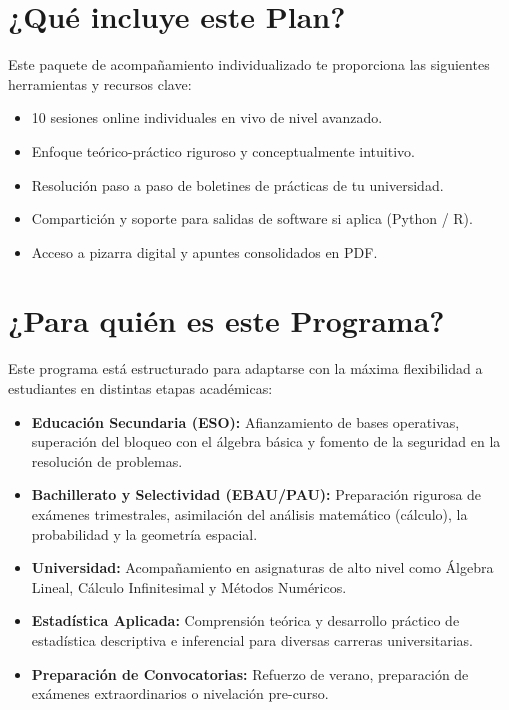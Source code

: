 \documentclass[11pt,a4paper]{article}
\begin{document}
\section{¿Qué incluye este Plan?}
Este paquete de acompañamiento individualizado te proporciona las siguientes herramientas y recursos clave:
\begin{itemize}
    \item 10 sesiones online individuales en vivo de nivel avanzado.
    \item Enfoque teórico-práctico riguroso y conceptualmente intuitivo.
    \item Resolución paso a paso de boletines de prácticas de tu universidad.
    \item Compartición y soporte para salidas de software si aplica (Python / R).
    \item Acceso a pizarra digital y apuntes consolidados en PDF.
\end{itemize}

\section{¿Para quién es este Programa?}
Este programa está estructurado para adaptarse con la máxima flexibilidad a estudiantes en distintas etapas académicas:
\begin{itemize}
    \item \textbf{Educación Secundaria (ESO):} Afianzamiento de bases operativas, superación del bloqueo con el álgebra básica y fomento de la seguridad en la resolución de problemas.
    \item \textbf{Bachillerato y Selectividad (EBAU/PAU):} Preparación rigurosa de exámenes trimestrales, asimilación del análisis matemático (cálculo), la probabilidad y la geometría espacial.
    \item \textbf{Universidad:} Acompañamiento en asignaturas de alto nivel como Álgebra Lineal, Cálculo Infinitesimal y Métodos Numéricos.
    \item \textbf{Estadística Aplicada:} Comprensión teórica y desarrollo práctico de estadística descriptiva e inferencial para diversas carreras universitarias.
    \item \textbf{Preparación de Convocatorias:} Refuerzo de verano, preparación de exámenes extraordinarios o nivelación pre-curso.
\end{itemize}

\newpage
\end{document}
